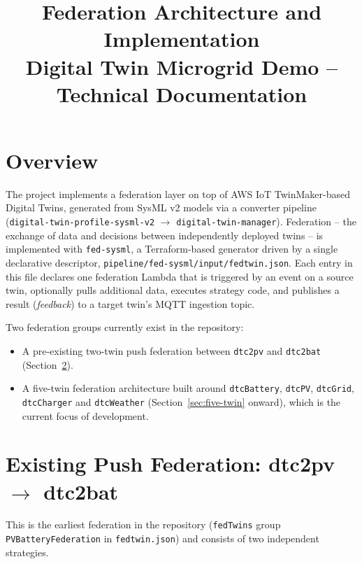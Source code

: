 \documentclass[11pt]{article}
\title{Federation Architecture and Implementation\\
\large Digital Twin Microgrid Demo -- Technical Documentation}
\author{}
\date{}
\renewcommand{\_}{\textunderscore\allowbreak}
\begin{document}
\maketitle

\section{Overview}

The project implements a federation layer on top of AWS IoT TwinMaker-based
Digital Twins, generated from SysML v2 models via a converter pipeline
(\texttt{digital-twin-profile-sysml-v2} $\rightarrow$ \texttt{digital-twin-manager}).
Federation -- the exchange of data and decisions between independently
deployed twins -- is implemented with \texttt{fed-sysml}, a Terraform-based
generator driven by a single declarative descriptor,
\texttt{pipeline/fed-sysml/input/fedtwin.json}. Each entry in this file
declares one federation Lambda that is triggered by an event on a source
twin, optionally pulls additional data, executes strategy code, and publishes
a result (\emph{feedback}) to a target twin's MQTT ingestion topic.

Two federation groups currently exist in the repository:
\begin{itemize}[nosep]
  \item A pre-existing two-twin push federation between \texttt{dtc2pv} and
        \texttt{dtc2bat} (Section~\ref{sec:legacy}).
  \item A five-twin federation architecture built around
        \texttt{dtcBattery}, \texttt{dtcPV}, \texttt{dtcGrid},
        \texttt{dtcCharger} and \texttt{dtcWeather} (Section~\ref{sec:five-twin}
        onward), which is the current focus of development.
\end{itemize}

\section{Existing Push Federation: dtc2pv $\rightarrow$ dtc2bat}
\label{sec:legacy}

This is the earliest federation in the repository (\texttt{fedTwins} group
\texttt{PVBatteryFederation} in \texttt{fedtwin.json}) and consists of two
independent strategies.
\end{document}
